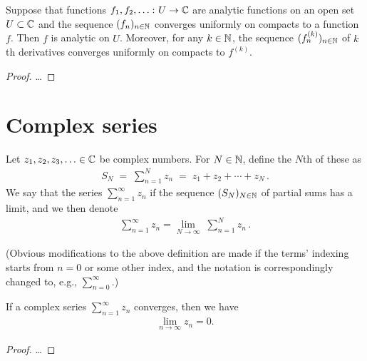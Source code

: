 \begin{lemma}
  \label{lem:uoc_limit_analytic}
  Suppose that functions $f_1, f_2, \ldots \colon U \to \mathbb{C}$
  are analytic functions on an open set $U \subset \mathbb{C}$
  and the sequence $(f_n)_{n \in \mathbb{N}}$ converges uniformly
  on compacts to a function $f$. Then $f$ is analytic on $U$.
  Moreover, for any $k \in \mathbb{N}$, the sequence $(f^{(k)}_n)_{n \in \mathbb{N}}$
  of $k$th derivatives converges uniformly on compacts to $f^{(k)}$.
\end{lemma}
\begin{proof}
  \ldots
\end{proof}



\section{Complex series}

\begin{definition}
  \label{def:complex_series}
  Let $z_1, z_2, z_3, \ldots \in \mathbb{C}$ be complex numbers.
  For $N \in \mathbb{N}$, define the $N$th  of these as
  \begin{align*}
    S_N \; = \; \sum_{n=1}^N z_n \; = \; z_1 + z_2 + \cdots + z_N \, .
  \end{align*}
  We say that the series $\sum_{n=1}^\infty z_n$ 
  if the sequence $(S_N)_{N \in \mathbb{N}}$ of partial sums has
  a limit, and we then denote
  \begin{align*}
    \sum_{n=1}^\infty z_n = \lim_{N \to \infty} \; \sum_{n=1}^N z_n \, .
  \end{align*}

  (Obvious modifications to the above definition are made
  if the terms' indexing starts from $n=0$ or some other index, and
  the notation is correspondingly changed to, e.g., $\sum_{n=0}^\infty$.)
\end{definition}

\begin{lemma}
  \label{lem:terms_tend_to_zero}
  If a complex series $\sum_{n=1}^\infty z_n$ converges,
  then we have
  \begin{align*}
    \lim_{n \to \infty} z_n = 0 .
  \end{align*}
\end{lemma}
\begin{proof}
  \ldots
\end{proof}

